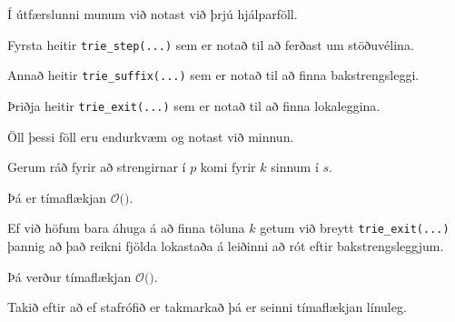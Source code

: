 {
    {
        \item<1-> Í útfærslunni munum við notast við þrjú hjálparföll.
        \item<2-> Fyrsta heitir \texttt{trie\_step(...)} sem er notað til að ferðast um stöðuvélina.
        \item<3-> Annað heitir \texttt{trie\_suffix(...)} sem er notað til að finna bakstrengsleggi.
        \item<4-> Þriðja heitir \texttt{trie\_exit(...)} sem er notað til að finna lokaleggina.
        \item<5-> Öll þessi föll eru endurkvæm og notast við minnun.
    }
}

{
}

{
}

{
}

{
    {
        \item<1-> Gerum ráð fyrir að strengirnar í $p$ komi fyrir $k$ sinnum í $s$.
        \item<2-> Þá er tímaflækjan $\mathcal{O}($$)$.
        \item<4-> Ef við höfum bara áhuga á að finna töluna $k$ getum við breytt \texttt{trie\_exit(...)}
                    þannig að það reikni fjölda lokastaða á leiðinni að rót eftir bakstrengsleggjum.
        \item<5-> Þá verður tímaflækjan $\mathcal{O}($$)$.
        \item<7-> Takið eftir að ef stafrófið er takmarkað þá er seinni tímaflækjan línuleg.
    }
}

{
}


